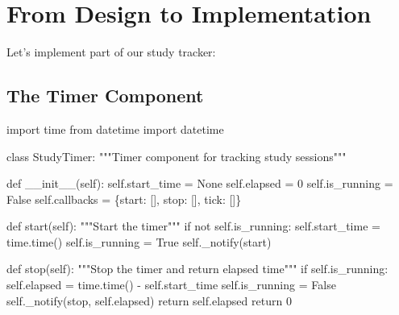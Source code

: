 \documentclass[
  letterpaper,
  DIV=11,
  numbers=noendperiod,
  oneside]{scrreprt}
\newenvironment{Shaded}{}{}
\newcommand{\CommentTok}[1]{\textcolor[rgb]{0.42,0.45,0.49}{#1}}
\newcommand{\ControlFlowTok}[1]{\textcolor[rgb]{0.84,0.23,0.29}{#1}}
\newcommand{\DecValTok}[1]{\textcolor[rgb]{0.00,0.36,0.77}{#1}}
\newcommand{\FunctionTok}[1]{\textcolor[rgb]{0.44,0.26,0.76}{#1}}
\newcommand{\ImportTok}[1]{\textcolor[rgb]{0.01,0.18,0.38}{#1}}
\newcommand{\KeywordTok}[1]{\textcolor[rgb]{0.84,0.23,0.29}{#1}}
\newcommand{\NormalTok}[1]{\textcolor[rgb]{0.14,0.16,0.18}{#1}}
\newcommand{\OperatorTok}[1]{\textcolor[rgb]{0.14,0.16,0.18}{#1}}
\newcommand{\StringTok}[1]{\textcolor[rgb]{0.01,0.18,0.38}{#1}}
\newcommand{\VariableTok}[1]{\textcolor[rgb]{0.89,0.38,0.04}{#1}}
\begin{document}
\section{From Design to
Implementation}\label{from-design-to-implementation}

Let's implement part of our study tracker:

\subsection{The Timer Component}\label{the-timer-component}

\begin{Shaded}
\begin{Highlighting}[]
\ImportTok{import}\NormalTok{ time}
\ImportTok{from}\NormalTok{ datetime }\ImportTok{import}\NormalTok{ datetime}

\KeywordTok{class}\NormalTok{ StudyTimer:}
    \CommentTok{"""Timer component for tracking study sessions"""}
    
    \KeywordTok{def} \FunctionTok{\_\_init\_\_}\NormalTok{(}\VariableTok{self}\NormalTok{):}
        \VariableTok{self}\NormalTok{.start\_time }\OperatorTok{=} \VariableTok{None}
        \VariableTok{self}\NormalTok{.elapsed }\OperatorTok{=} \DecValTok{0}
        \VariableTok{self}\NormalTok{.is\_running }\OperatorTok{=} \VariableTok{False}
        \VariableTok{self}\NormalTok{.callbacks }\OperatorTok{=}\NormalTok{ \{}\StringTok{\textquotesingle{}start\textquotesingle{}}\NormalTok{: [], }\StringTok{\textquotesingle{}stop\textquotesingle{}}\NormalTok{: [], }\StringTok{\textquotesingle{}tick\textquotesingle{}}\NormalTok{: []\}}
    
    \KeywordTok{def}\NormalTok{ start(}\VariableTok{self}\NormalTok{):}
        \CommentTok{"""Start the timer"""}
        \ControlFlowTok{if} \KeywordTok{not} \VariableTok{self}\NormalTok{.is\_running:}
            \VariableTok{self}\NormalTok{.start\_time }\OperatorTok{=}\NormalTok{ time.time()}
            \VariableTok{self}\NormalTok{.is\_running }\OperatorTok{=} \VariableTok{True}
            \VariableTok{self}\NormalTok{.\_notify(}\StringTok{\textquotesingle{}start\textquotesingle{}}\NormalTok{)}
    
    \KeywordTok{def}\NormalTok{ stop(}\VariableTok{self}\NormalTok{):}
        \CommentTok{"""Stop the timer and return elapsed time"""}
        \ControlFlowTok{if} \VariableTok{self}\NormalTok{.is\_running:}
            \VariableTok{self}\NormalTok{.elapsed }\OperatorTok{=}\NormalTok{ time.time() }\OperatorTok{{-}} \VariableTok{self}\NormalTok{.start\_time}
            \VariableTok{self}\NormalTok{.is\_running }\OperatorTok{=} \VariableTok{False}
            \VariableTok{self}\NormalTok{.\_notify(}\StringTok{\textquotesingle{}stop\textquotesingle{}}\NormalTok{, }\VariableTok{self}\NormalTok{.elapsed)}
            \ControlFlowTok{return} \VariableTok{self}\NormalTok{.elapsed}
        \ControlFlowTok{return} \DecValTok{0}
    

\end{Highlighting}
\end{Shaded}
\end{document}
